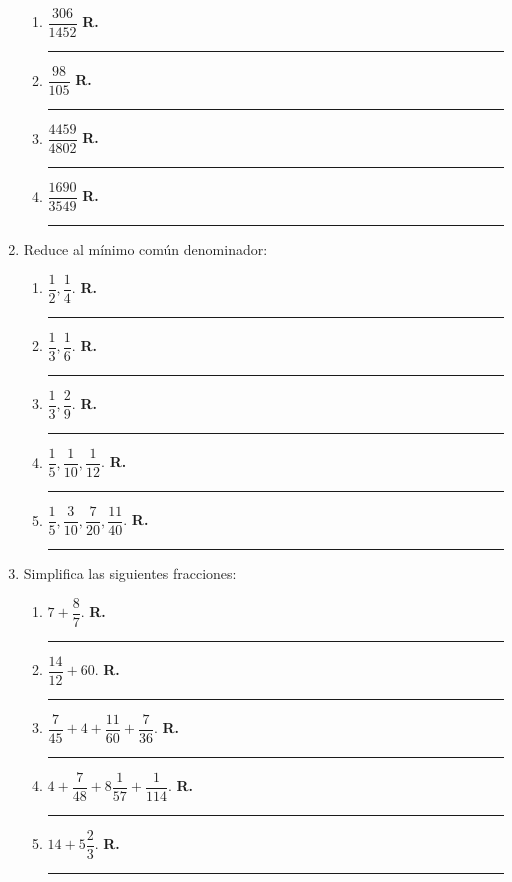 \begin{enumerate}
\begin{enumerate}[label=\alph*)]
\item $\dfrac{306}{1452}$ \hspace{0.3cm} \textbf{R.} \rule{3cm}{0.1mm}
\item $\dfrac{98}{105}$ \hspace{0.3cm} \textbf{R.} \rule{3cm}{0.1mm}
\item $\dfrac{4459}{4802}$ \hspace{0.3cm} \textbf{R.} \rule{3cm}{0.1mm}
\item $\dfrac{1690}{3549}$ \hspace{0.3cm} \textbf{R.} \rule{3cm}{0.1mm}
\end{enumerate}
\newpage
\item Reduce al mínimo común denominador:
\begin{enumerate}[label=\alph*)]
\item $\dfrac{1}{2}, \dfrac{1}{4}$. \hspace{0.3cm} \textbf{R.} \rule{3cm}{0.1mm}
\item $\dfrac{1}{3}, \dfrac{1}{6}$. \hspace{0.3cm} \textbf{R.} \rule{3cm}{0.1mm}
\item $\dfrac{1}{3}, \dfrac{2}{9}$. \hspace{0.3cm} \textbf{R.} \rule{3cm}{0.1mm}
\item $\dfrac{1}{5}, \dfrac{1}{10}, \dfrac{1}{12}$. \hspace{0.3cm} \textbf{R.} \rule{3cm}{0.1mm}
\item $\dfrac{1}{5}, \dfrac{3}{10}, \dfrac{7}{20}, \dfrac{11}{40}$. \hspace{0.3cm} \textbf{R.} \rule{3cm}{0.1mm}
\end{enumerate}
\item Simplifica las siguientes fracciones:
\begin{enumerate}[label=\alph*)]
\item $7 + \dfrac{8}{7}$. \hspace{0.3cm} \textbf{R.} \rule{3cm}{0.1mm}
\item $\dfrac{14}{12} + 60$. \hspace{0.3cm} \textbf{R.} \rule{3cm}{0.1mm}
\item $\dfrac{7}{45} + 4 + \dfrac{11}{60} + \dfrac{7}{36}$. \hspace{0.3cm} \textbf{R.} \rule{3cm}{0.1mm}
\item $4 + \dfrac{7}{48} + 8 \dfrac{1}{57} + \dfrac{1}{114}$. \hspace{0.3cm} \textbf{R.} \rule{3cm}{0.1mm}
\item $14 + 5 \dfrac{2}{3}$. \hspace{0.3cm} \textbf{R.} \rule{3cm}{0.1mm}
\end{enumerate}
\end{enumerate}
